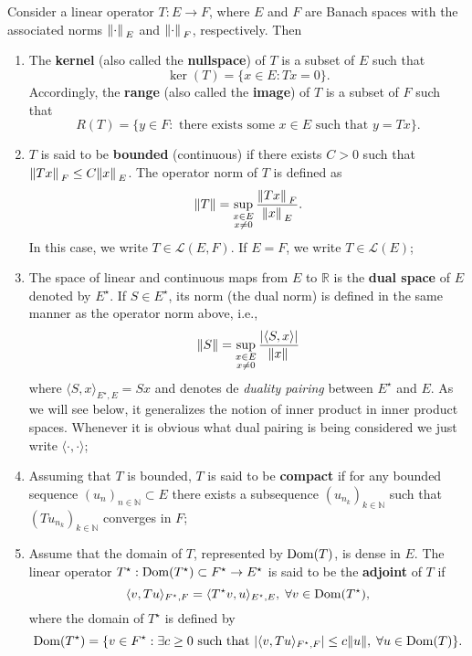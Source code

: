 \begin{definition}\label{banach_op_def}
    Consider a linear operator \(T: E \rightarrow F\), where \(E\) and \(F\) are Banach spaces with the associated norms \(\norm*{\cdot}_E\) and \(\norm*{\cdot}_F\), respectively. Then
    \begin{enumerate}
        \item The \textbf{kernel} (also called the \textbf{nullspace}) of \(T\) is a subset of \(E\) such that
        \[
            \ker(T) = \{x \in E: Tx = 0\}.
        \]
        Accordingly, the \textbf{range} (also called the \textbf{image}) of \(T\) is a subset of \(F\) such that
        \[
            R(T) = \{y \in F: \text{ there exists some } x \in E \text{ such that } y = Tx\}.
        \]
        \item \(T\) is said to be \textbf{bounded} (continuous) if there exists \(C > 0\) such that \(\norm*{Tx}_F \leq C \norm*{x}_E\). The operator norm of \(T\) is defined as
        \[
            \norm{T} = \sup_{\substack{x \in E\\ x \neq 0}}\frac{\norm*{Tx}_F}{\norm*{x}_E}.
        \]
        In this case, we write \(T \in \mathcal{L}(E, F)\). If \(E=F\), we write \(T \in \mathcal{L}(E)\);

        \item The space of linear and continuous maps from \(E\) to \(\mathbb{R}\) is the \textbf{dual space} of \(E\) denoted by \(E^\star\). If \(S \in E^\star\), its norm (the dual norm) is defined in the same manner as the operator norm above, i.e.,
        \[
            \norm{S} = \sup_{\substack{x \in E\\ x \neq 0}}\frac{\abs{\langle S, x \rangle}}{\norm*{x}}
        \]
        where \(\langle S, x \rangle_{E^\star, E} = Sx\) and denotes de \textit{duality pairing} between \(E^\star\) and \(E\). As we will see below, it generalizes the notion of inner product in inner product spaces. Whenever it is obvious what dual pairing is being considered we just write \(\langle \cdot, \cdot \rangle\);        
        \item Assuming that \(T\) is bounded, \(T\) is said to be \textbf{compact} if for any bounded sequence \((u_n)_{n \in \mathbb{N}} \subset E\) there exists a subsequence \((u_{n_k})_{k \in \mathbb{N}}\) such that \((T u_{n_k})_{k \in \mathbb{N}}\) converges in \(F\);
        \item Assume that the domain of \(T\), represented by \(\operatorname{Dom}(T)\), is dense in \(E\). The linear operator \(T^\star: \operatorname{Dom}(T^\star) \subset F^\star \rightarrow E^\star\) is said to be the \textbf{adjoint} of \(T\) if 
        \[
            \langle v, T u \rangle_{F^\star, F} = \langle T^\star v, u \rangle_{E^\star, E}, \; \forall v \in \operatorname{Dom}(T^\star),
        \]
        where the domain of \(T^\star\) is defined by
        \[
            \operatorname{Dom}(T^\star) = \{v \in F^\star: \exists c \geq 0 \text{ such that } \abs{\langle v, T u \rangle_{F^\star, F}} \leq c \norm{u}, \; \forall u \in \operatorname{Dom}(T)\}.
        \]
    \end{enumerate}
\end{definition}
